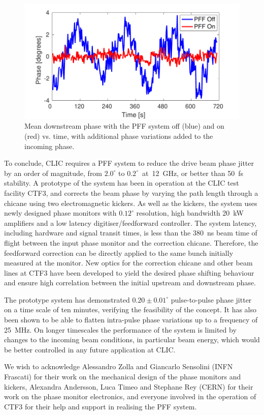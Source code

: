 \documentclass[%
 reprint,
 superscriptaddress,
 amsmath,
 amssymb,
 prl,
]{revtex4-1}
\begin{document}
\begin{figure}
	\includegraphics[width=\columnwidth]{figs/wiggle}
	\caption{\label{fig:wiggle}Mean downstream phase with the PFF system off 
		(blue) and on (red) vs. time, with additional phase variations added to 
		the 
		incoming phase.}
\end{figure}

To conclude, CLIC requires a PFF system to reduce the drive beam phase jitter 
by an order of magnitude, from \(2.0^\circ\) to \(0.2^\circ\)~at~12~GHz, or 
better than 50~fs stability. A prototype of the system has been 
in operation at the CLIC test facility CTF3, and corrects the beam phase by 
varying the path length through a chicane using two electromagnetic kickers. 
As well as the kickers, the system uses newly designed phase monitors with 
\(0.12^\circ\) resolution, high bandwidth 20~kW amplifiers and a low latency 
digitiser/feedforward controller. The system latency, including hardware and 
signal transit times, is less than the 380~ns beam time of flight between the 
input phase monitor and the correction chicane. Therefore, the feedforward 
correction can be directly applied to the same bunch initially measured at the 
monitor. New optics for the correction chicane and other beam lines at CTF3 
have been 
developed to yield the desired phase shifting behaviour and ensure high 
correlation between the initial upstream and downstream phase.

The prototype system has demonstrated \(0.20\pm0.01^\circ\) pulse-to-pulse 
phase jitter on a time scale of ten minutes, verifying the feasibility of the 
concept. It has also been shown to be able 
to flatten intra-pulse phase variations up to a frequency of 25~MHz. On longer 
timescales the performance of the system is limited by changes to the incoming 
beam conditions, in particular beam energy, which would be better controlled in 
any future application at CLIC.

\begin{acknowledgments}
	We wish to acknowledge Alessandro Zolla and Giancarlo Sensolini (INFN 
	Frascati) for their work on the mechanical design of the phase monitors and 
	kickers, 
	Alexandra Andersson, Luca Timeo and Stephane Rey (CERN) for their work on 
	the phase monitor electronics, and everyone involved in the operation of 
	CTF3 for their help and support in realising the PFF system.
\end{acknowledgments}


\end{document}

